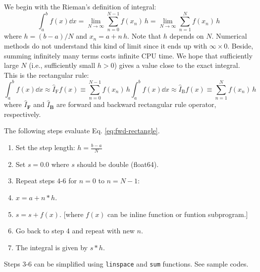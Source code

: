 We begin with the Rieman's definition of integral:
\begin{equation}
\int_{a}^{b} f(x) \dd{x} = \lim_{N \rightarrow \infty} \sum_{n=0}^{N-1} f(x_n)\, h  = \lim_{N \rightarrow \infty} \sum_{n=1}^{N} f(x_n)\, h
\end{equation}
where $h =(b-a)/N$ and $x_n=a + n\, h$.   Note that $h$ depends on $N$.  Numerical methods do not understand this kind of limit since it ends up with $\infty \times 0$.  Beside, summing infinitely many terms costs infinite CPU time.  We hope that sufficiently large $N$ (i.e., sufficiently small $h>0$) gives a value close to the exact integral. This is the rectangular rule:
\begin{subequations}\label{eq:rectangular-rule}
\begin{equation}\label{eq:fwd-rectangle}
\int_{a}^{b} f(x) \dd{x} \approx \hat{I}_\text{F} f(x) \equiv \sum_{n=0}^{N-1} f(x_n)\, h 
\end{equation}
\begin{equation}\label{eq:bwd-rectangle}
\int_{a}^{b} f(x) \dd{x} \approx \hat{I}_\text{B} f(x) \equiv\sum_{n=1}^{N} f(x_n)\, h
\end{equation}
\end{subequations}
where $\hat{I}_\textbf{F}$ and $\hat{I}_\textbf{B}$ are forward and backward rectangular rule operator, respectively.

\begin{myalgobox}
    \label{algo:fwd-rectangle}
    
    \medskip
    The following steps evaluate Eq. \ref{eq:fwd-rectangle}.
    
    \medskip
    \begin{enumerate}
        \item Set the step length: $h=\displaystyle\frac{b-a}{N}$
        \item Set $s=0.0$ where $s$ should be double (float64).
        \item Repeat steps 4-6 for $n=0$ to $n=N-1$:
        \item $x=a+n*h$.
        \item $s=s+f(x)$.  [where $f(x)$ can be inline function or funtion subprogram.]
        \item Go back to step 4 and repeat with new $n$.
        \item The integral is given by $s*h$.
    \end{enumerate}

\bigskip
Steps 3-6 can be simplified using \texttt{linspace} and \texttt{sum} functions. See sample codes.
\end{myalgobox}


